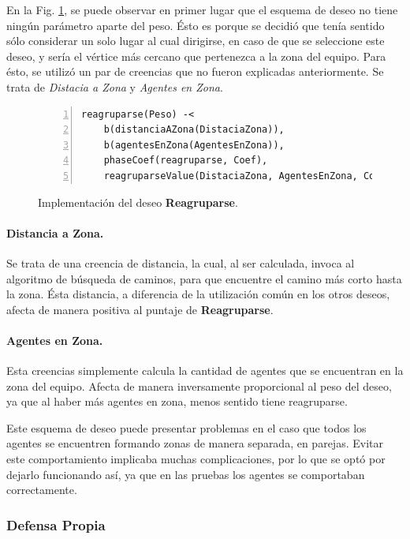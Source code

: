 \documentclass[oneside]{book}
\theoremstyle{definition}
\begin{document}
En la Fig. \ref{fig:deseoReagruparse}, se puede observar en primer lugar que el esquema 
de deseo no tiene ningún parámetro aparte del peso. Ésto es porque se decidió que tenía 
sentido sólo considerar un solo lugar al cual dirigirse, en caso de que se seleccione 
este deseo, y sería el vértice más cercano que pertenezca a la zona del equipo. Para 
ésto, se utilizó un par de creencias que no fueron explicadas anteriormente. Se trata de 
\textit{Distacia a Zona} y \textit{Agentes en Zona}.


\begin{figure}[h]
\begin{Verbatim}[numbers=left]
reagruparse(Peso) -< 
    b(distanciaAZona(DistaciaZona)),
	b(agentesEnZona(AgentesEnZona)),
    phaseCoef(reagruparse, Coef),
    reagruparseValue(DistaciaZona, AgentesEnZona, Coef, Value).
\end{Verbatim}
\caption{Implementación del deseo \textbf{Reagruparse}.}
\label{fig:deseoReagruparse}
\end{figure}


\paragraph{Distancia a Zona.}

Se trata de una creencia de distancia, la cual, al ser calculada, invoca al algoritmo
de búsqueda de caminos, para que encuentre el camino más corto hasta la zona. Ésta 
distancia, a diferencia de la utilización común en los otros deseos, afecta de manera 
positiva al puntaje de \textbf{Reagruparse}.

\paragraph{Agentes en Zona.}

Esta creencias simplemente calcula la cantidad de agentes que se encuentran en la zona
del equipo. Afecta de manera inversamente proporcional al peso del deseo, ya que al 
haber más agentes en zona, menos sentido tiene reagruparse.

\vspace{\baselineskip} 
Este esquema de deseo puede presentar problemas en el caso que todos los agentes se 
encuentren formando zonas de manera separada, en parejas. Evitar este comportamiento
implicaba muchas complicaciones, por lo que se optó por dejarlo funcionando así, ya
que en las pruebas los agentes se comportaban correctamente.


\subsubsection{Defensa Propia}
\end{document}
